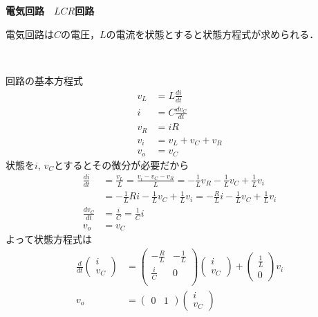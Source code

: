 \documentclass[a4paper,11pt]{jreport}
\begin{document}
\newpage
\noindent
{\bf 電気回路　$LCR$回路}

電気回路は$C$の電圧，$L$の電流を状態とすると状態方程式が求められる．
\begin{figure}[htbp]
 \begin{center}
 \end{center}
\end{figure}

回路の基本方程式
\begin{align*}
	v_L & = L \frac{d i}{dt} \\
	i & = C \frac{d v_C}{dt} \\
	v_R &= i R \\
	v_i & = v_L + v_C + v_R \\
	v_o & = v_C
\end{align*}
状態を$i$, $v_C$とするとその微分が必要だから
\begin{align*}
	\frac{d i}{dt} 
	&= \frac{v_L}{L} 
	= \frac{v_i - v_C - v_R}{L} 
	= - \frac{1}{L} v_R - \frac{1}{L} v_C + \frac{1}{L} v_i 
\\ &
	= - \frac{1}{L} R i - \frac{1}{L} v_C + \frac{1}{L} v_i 
	= - \frac{R}{L} i - \frac{1}{L} v_C + \frac{1}{L} v_i \\
	\frac{d v_C}{dt}
	&= \frac{i}{C} 
	= \frac{1}{C} i \\
	v_o &= v_C 
\end{align*}
よって状態方程式は
\begin{align*}
	\frac{d}{dt}
	\left (
	\begin{array}{c}
		i \\
		v_C
	\end{array}
	\right )
	&=
	\left (
	\begin{array}{cc}
		-\frac{R}{L} & -\frac{1}{L} \\
		\frac{i}{C} & 0 \\
	\end{array}
	\right )
	\left (
	\begin{array}{c}
		i \\
		v_C
	\end{array}
	\right )
	+
	\left (
	\begin{array}{c}
		\frac{1}{L} \\
		0
	\end{array}
	\right )
	v_i
\\
	v_o 
	&=
	\left (
	\begin{array}{cc}
		0 & 1 
	\end{array}
	\right )
	\left (
	\begin{array}{c}
		i \\
		v_C
	\end{array}
	\right )
\end{align*}
\end{document}
